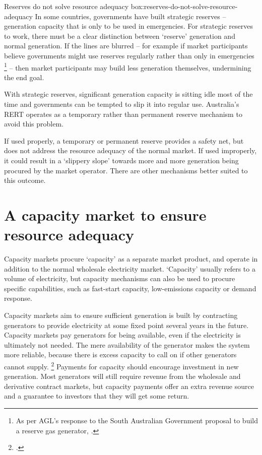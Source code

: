 \documentclass[FrontPage]{grattan}
\begin{document}
\begin{smallbox}{Reserves do not solve resource adequacy }{box:reserves-do-not-solve-resource-adequacy}
In some countries, governments have built strategic reserves -- generation capacity that is only to be used in emergencies. For strategic reserves to work, there must be a clear distinction between `reserve' generation and normal generation. If the lines are blurred -- for example if market participants believe governments might use reserves regularly rather than only in emergencies%
\footnote{As per AGL's response to the South Australian Government proposal to build a reserve gas generator, \textcite{MacdonaldSmith2017AGLshredsPlans}.}
-- then market participants may build less generation themselves, undermining the end goal.

With strategic reserves, significant generation capacity is sitting idle most of the time and governments can be tempted to slip it into regular use. Australia's RERT operates as a temporary rather than permanent reserve mechanism to avoid this problem.

If used properly, a temporary or permanent reserve provides a safety net, but does not address the resource adequacy of the normal market. If used improperly, it could result in a `slippery slope' towards more and more generation being procured by the market operator. There are other mechanisms better suited to this outcome. 
\end{smallbox}


\section{A capacity market to ensure resource adequacy}\label{sec:a-capacity-market-to-ensure-resource-adequacy}
Capacity markets procure `capacity' as a separate market product, and operate in addition to the normal wholesale electricity market. `Capacity' usually refers to a volume of electricity, but capacity mechanisms can also be used to procure specific capabilities, such as fast-start capacity, low-emissions capacity or demand response.

Capacity markets aim to ensure sufficient generation is built by contracting generators to provide electricity at some fixed point several years in the future. Capacity markets pay generators for being available, even if the electricity is ultimately not needed. The mere availability of the generator makes the system more reliable, because there is excess capacity to call on if other generators cannot supply.%
\footcite{Cramton2005CapacityMarket}
Payments for capacity should encourage investment in new generation. Most generators will still require revenue from the wholesale and derivative contract markets, but capacity payments offer an extra revenue source and a guarantee to investors that they will get some return.
\end{document}
